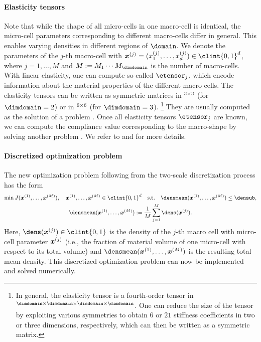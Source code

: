 \paragraph{Elasticity tensors}

Note that while the shape of all micro-cells in one macro-cell is identical,
the micro-cell parameters corresponding to different macro-cells differ
in general.
This enables varying densities in different regions of $\domain$.
We denote the parameters of the $j$-th macro-cell
with $\*x^{(j)} = (x_1^{(j)}, \dotsc, x_d^{(j)}) \in \clint{0, 1}^d$,
where $j = 1, \dotsc, M$ and
$M := M_1 \dotsm M_{\dimdomain}$ is the number of macro-cells.
With linear elasticity,
one can compute so-called  $\etensor_j$,
which encode information about the material properties
of the different macro-cells.
The elasticity tensors can be written as symmetric matrices
in $\real^{3 \times 3}$ (for $\dimdomain = 2$) or
in $\real^{6 \times 6}$ (for $\dimdomain = 3$).%
\footnote{%
  In general, the elasticity tensor is a fourth-order tensor in
  $\real^{\dimdomain \times \dimdomain \times \dimdomain \times \dimdomain}$.
  One can reduce the size of the tensor by exploiting various symmetries
  \cite{Huebner14Mehrdimensionale}
  to obtain $6$ or $21$ stiffness coefficients
  in two or three dimensions, respectively,
  which can then be written as a symmetric matrix.%
}
They are usually computed as the solution of a \fem problem
.
Once all elasticity tensors $\etensor_j$ are known,
we can compute the compliance value corresponding to the macro-shape
by solving another \fem problem .
We refer to \cite{Allaire04Topology} and \cite{Huebner14Mehrdimensionale}
for more details.

\paragraph{Discretized optimization problem}

The new optimization problem following from the
two-scale discretization process has the form
\begin{subequations}
  \label{eq:topoOptProblemDiscrete}
  \begin{gather}
    \min J(\*x^{(1)}, \dotsc, \*x^{(M)}),\quad
    \*x^{(1)}, \dotsc, \*x^{(M)} \in \clint{0, 1}^d
    \quad\text{s.t.}\quad
    \densmean(\*x^{(1)}, \dotsc, \*x^{(M)}) \le \densub,\\
    \densmean(\*x^{(1)}, \dotsc, \*x^{(M)})
    := \frac{1}{M} \sum_{j=1}^M \dens(\*x^{(j)}).
  \end{gather}
\end{subequations}
Here, $\dens(\*x^{(j)}) \in \clint{0, 1}$ is the
density of the $j$-th macro cell with micro-cell parameter ${\boldsymbol{x}}^{(j)}$
(i.e., the fraction of material volume of one micro-cell
with respect to its total volume)
and $\densmean(\*x^{(1)}, \dotsc, \*x^{(M)})$ is the resulting
total mean density.
This discretized optimization problem can now be implemented and
solved numerically.



